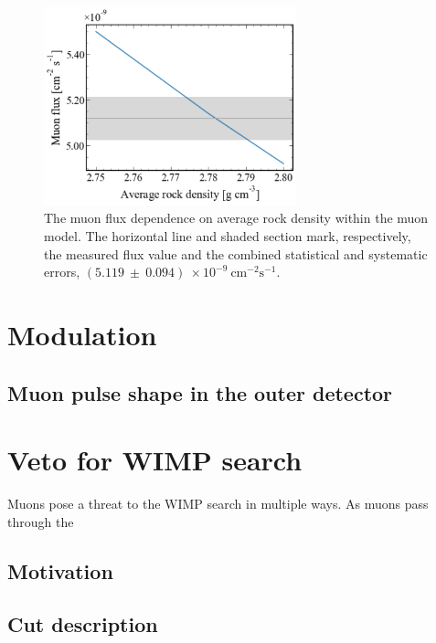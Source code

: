 \begin{figure}[htbp]
    \centering
    \includegraphics[width=0.65\textwidth]{figures/Muons/Flux_density_ws22_ws24.pdf}
    \caption{The muon flux dependence on average rock density within the muon model. The horizontal line and shaded section mark, respectively, the measured flux value and the combined statistical and systematic errors, $(5.119~\pm~0.094)~\times10^{-9}~\textrm{cm}^{-2}\textrm{s}^{-1}$.}
    \label{fig:flux_density}
\end{figure}


\section{Modulation}\label{sec:Muons/MuonModulation}
\subsection{Muon pulse shape in the outer detector}

\section{Veto for WIMP search}\label{sec:Muons/MuonVeto}
Muons pose a threat to the WIMP search in multiple ways. As muons pass through the 
\subsection{Motivation}

\subsection{Cut description}